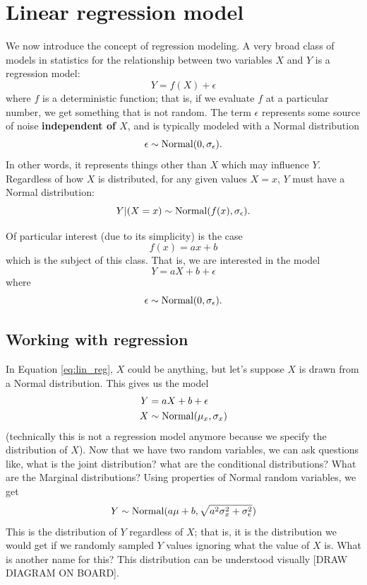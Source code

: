 \section{Linear regression model}
We now introduce the concept of regression modeling. 
 A very broad class of models in statistics for the relationship between two variables $X$ and $Y$ is a regression model:
\begin{equation}
Y = f(X) + \epsilon
\end{equation}
where $f$ is a deterministic function; that is, if we evaluate $f$ at a particular number, we get something that is not random. The term $\epsilon$ represents some source of noise {\bf independent of $X$}, and is typically modeled with a Normal distribution
\begin{equation}
\epsilon \sim {\rm Normal}(0,\sigma_{\epsilon}).
\end{equation}
In other words, it represents things other than $X$ which may influence $Y$.
Regardless of how $X$ is distributed, for any given values $X=x$, $Y$ must have a Normal distribution:
\begin{equation}
Y|(X=x) \sim {\rm Normal}(f(x),\sigma_{\epsilon}). 
\end{equation}

Of particular interest (due to its simplicity) is the case
\begin{equation}
f(x) = ax + b
\end{equation}
which is the subject of this class. That is, we are interested in the model
\begin{equation}\label{eq:lin_reg}
Y =  aX + b + \epsilon
\end{equation}
where 
\begin{equation}
\epsilon \sim {\rm Normal}(0,\sigma_{\epsilon}). 
\end{equation}

\subsection{Working with regression}

In Equation \eqref{eq:lin_reg}, $X$ could be anything, but let's suppose $X$ is drawn from a Normal distribution. 
This gives us the model 
\begin{align}\label{eq:wwr}
Y &=  aX + b + \epsilon\\
X &\sim {\rm Normal}(\mu_x,\sigma_x)
\end{align}
(technically this is not a regression model anymore because we specify the distribution of $X$). Now that we have two random variables, we can ask questions like, what is the joint distribution? what are the conditional distributions? What are the Marginal distributions? 
Using properties of Normal random variables, we get 
\begin{equation}
Y \sim {\rm Normal}(a\mu + b,\sqrt{a^2\sigma_x^2 + \sigma_{\epsilon}^2})
\end{equation}
This is the distribution of $Y$ regardless of $X$; that is, it is the distribution we would get if we randomly sampled $Y$ values ignoring what the value of $X$ is. What is another name for this? 
This distribution can be understood visually [DRAW DIAGRAM ON BOARD]. 



